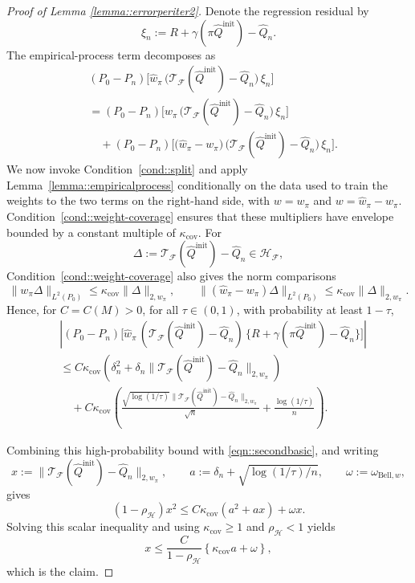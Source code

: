 \documentclass{article}
\theoremstyle{plain}
\theoremstyle{definition}
\theoremstyle{remark}
\begin{document}
\begin{proof}[Proof of Lemma \ref{lemma::errorperiter2}]
Denote the regression residual by
\[
\xi_n := R + \gamma(\pi \hat Q^{\mathrm{init}}) - \hat Q_n .
\]
The empirical-process term decomposes as
\begin{align*}
&(P_0 - P_n)\Big[
   \hat w_{\pi}\,
   \bigl(\mathcal T_{\mathcal F}(\hat Q^{\mathrm{init}}) - \hat Q_n\bigr)\,
   \xi_n
\Big]
\\
&=
(P_0 - P_n)\Big[
   w_{\pi}\,
   \bigl(\mathcal T_{\mathcal F}(\hat Q^{\mathrm{init}}) - \hat Q_n\bigr)\,
   \xi_n
\Big]
\\
&\quad+
(P_0 - P_n)\Big[
   \bigl(\hat w_{\pi} - w_{\pi}\bigr)\,
   \bigl(\mathcal T_{\mathcal F}(\hat Q^{\mathrm{init}}) - \hat Q_n\bigr)\,
   \xi_n
\Big].
\end{align*}
We now invoke Condition~\ref{cond::split} and apply
Lemma~\ref{lemma::empiricalprocess} conditionally on the data used to train the
weights to the two terms on the right-hand side, with \(w=w_{\pi}\) and
\(w=\hat{w}_{\pi}-w_{\pi}\). Condition~\ref{cond::weight-coverage} ensures that
these multipliers have envelope bounded by a constant multiple of
\(\kappa_{\mathrm{cov}}\). For
\[
\Delta:=\mathcal T_{\mathcal F}(\hat Q^{\mathrm{init}})-\hat Q_n
\in \mathcal H_{\mathcal F},
\]
Condition~\ref{cond::weight-coverage} also gives the norm comparisons
\[
\|w_\pi\Delta\|_{L^2(P_0)}
\le
\kappa_{\mathrm{cov}}
\|\Delta\|_{2,w_\pi},
\qquad
\|(\widehat w_\pi-w_\pi)\Delta\|_{L^2(P_0)}
\le
\kappa_{\mathrm{cov}}
\|\Delta\|_{2,w_\pi}.
\]
Hence, for \(C=C(M)>0\), for all \(\tau \in (0,1)\), with probability at
least \(1-\tau\),
\begin{align*}
&\left|(P_0 - P_n)\big[
   \hat{w}_{\pi}\,
   (\mathcal{T}_{\mathcal{F}}(\hat{Q}^{\mathrm{init}}) - \hat{Q}_n)\,
   \{R + \gamma(\pi \hat{Q}^{\mathrm{init}}) - \hat{Q}_n\}
\big]\right|
\\
&\le
C\kappa_{\mathrm{cov}}
\left(
    \delta_n^2
    + \delta_n
        \|\mathcal{T}_{\mathcal{F}}(\hat{Q}^{\mathrm{init}}) - \hat{Q}_n\|_{2,w_{\pi}}
\right)
\\
&\quad+
C\kappa_{\mathrm{cov}}
\left(
    \frac{
        \sqrt{\log(1/\tau)}
        \|\mathcal{T}_{\mathcal{F}}(\hat{Q}^{\mathrm{init}}) - \hat{Q}_n\|_{2,w_{\pi}}
    }{\sqrt{n}}
    +
    \frac{\log(1/\tau)}{n}
\right).
\end{align*}

Combining this high-probability bound with \eqref{eqn::secondbasic}, and
writing
\[
x:=\|\mathcal{T}_{\mathcal F}(\hat Q^{\mathrm{init}})-\hat Q_n\|_{2,w_\pi},
\qquad
a:=\delta_n+\sqrt{\log(1/\tau)/n},
\qquad
\omega:=\omega_{\mathrm{Bell},w},
\]
gives
\[
(1-\rho_{\mathcal H})x^2
\le
C\kappa_{\mathrm{cov}}(a^2+ax)+\omega x .
\]
Solving this scalar inequality and using
\(\kappa_{\mathrm{cov}}\ge1\) and \(\rho_{\mathcal H}<1\) yields
\[
x
\le
\frac{C}{1-\rho_{\mathcal H}}
\left\{
\kappa_{\mathrm{cov}}a+\omega
\right\},
\]
which is the claim.
\end{proof}
 
\end{document}
